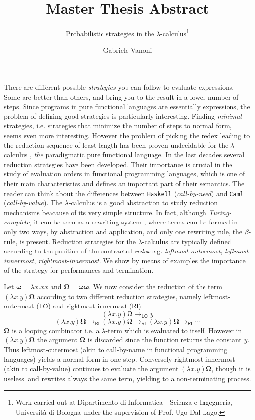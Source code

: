 \documentclass[english]{llncs}
\newcommand{\redlo}{\longrightarrow_\pslo}
\newcommand{\redri}{\longrightarrow_\psri}
\newcommand{\pslo}{\mathsf{LO}}
\newcommand{\psri}{\mathsf{RI}}
\begin{document}
\title{Master Thesis Abstract}
\subtitle{Probabilistic strategies in the $\lambda$-calculus\thanks{Work carried out at Dipartimento di Informatica - Scienza e Ingegneria, Università di Bologna under the supervision of Prof. Ugo Dal Lago.}}
\author{Gabriele Vanoni}
\maketitle
There are different possible \emph{strategies} you can follow to evaluate expressions. Some are better than others, and bring you to the result in a lower number of steps. Since programs in pure functional languages are essentially expressions, the problem of defining good strategies is particularly interesting. Finding \emph{minimal} strategies, i.e. strategies that minimize the number of steps to normal form, seems even more interesting. However the problem of picking the redex leading to the reduction sequence of least length has been proven undecidable for the $\lambda$-calculus \cite[Section~13.5]{barendregt_lambda_1984}, \emph{the} paradigmatic pure functional language. In the last decades several reduction strategies have been developed. Their importance is crucial in the study of evaluation orders in functional programming languages, which is one of their main characteristics and defines an important part of their semantics. The reader can think about the differences between \texttt{Haskell} (\emph{call-by-need}) and \texttt{Caml} (\emph{call-by-value}). The $\lambda$-calculus is a good abstraction to study reduction mechanisms beacause of its very simple structure. In fact, although \emph{Turing-complete}, it can be seen as a rewriting system \cite{terese_term_2003}, where terms can be formed in only two ways, by abstraction and application, and only one rewriting rule, the $\beta$-rule, is present. Reduction strategies for the $\lambda$-calculus are typically defined according to the position of the contracted \emph{redex} e.g. \emph{leftmost-outermost}, \emph{leftmost-innermost}, \emph{rightmost-innermost}. We show by means of examples the importance of the strategy for performances and termination.
\begin{example}\label{example:canc}
	Let $\bm{\omega}=\lambda x.xx$ and $\bm{\Omega}=\bm{\omega\omega}$. We now consider the reduction of the term $(\lambda x.y)\bm{\Omega}$ according to two different reduction strategies, namely leftmost-outermost ($\pslo$) and rightmost-innermost ($\psri$).
	$$
	(\lambda x.y)\bm{\Omega}\redlo y
	$$
	$$
	(\lambda x.y)\bm{\Omega}\redri(\lambda x.y)\bm{\Omega}\redri(\lambda x.y)\bm{\Omega}\redri\cdots
	$$
	$\bm{\Omega}$ is a looping combinator i.e. a $\lambda$-term which is evaluated to itself. However in $(\lambda x.y)\bm{\Omega}$ the argument $\bm{\Omega}$ is discarded since the function returns the constant $y$. Thus leftmost-outermost (akin to call-by-name in functional programming languages) yields a normal form in one step. Conversely rightmost-innermost (akin to call-by-value) continues to evaluate the argument $(\lambda x.y)\bm{\Omega}$, though it is useless, and rewrites always the same term, yielding to a non-terminating process.
\end{example}
\end{document}
